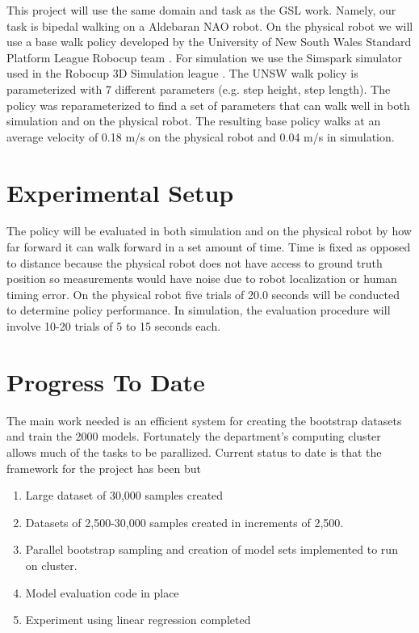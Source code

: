 \documentclass[12 pt,two column]{article}
\begin{document}
This project will use the same domain and task as the GSL work. Namely, our task is bipedal walking on a Aldebaran NAO robot. On the physical robot we will use a base walk policy developed by the University of New South Wales Standard Platform League Robocup team \cite{ashar2014robocup}. For simulation we use the Simspark simulator used in the Robocup 3D Simulation league \cite{simspark}. The UNSW walk policy is parameterized with 7 different parameters (e.g. step height, step length). The policy was reparameterized to find a set of parameters that can walk well in both simulation and on the physical robot. The resulting base policy walks at an average velocity of 0.18 m/s on the physical robot and 0.04 m/s in simulation.

\section{Experimental Setup}

The policy will be evaluated in both simulation and on the physical robot by how far forward it can walk forward in a set amount of time. Time is fixed as opposed to distance because the physical robot does not have access to ground truth position so measurements would have noise due to robot localization or human timing error. On the physical robot five trials of 20.0 seconds will be conducted to determine policy performance. In simulation, the evaluation procedure will involve 10-20 trials of 5 to 15 seconds each. 

\section{Progress To Date}
The main work needed is an efficient system for creating the bootstrap datasets and train the 2000 models. Fortunately the department's computing cluster allows much of the tasks to be parallized. Current status to date is that the framework for the project has been but 

\begin{enumerate}
\item Large dataset of 30,000 samples created
\item Datasets of 2,500-30,000 samples created in increments of 2,500.
\item Parallel bootstrap sampling and creation of model sets implemented to run on cluster.
\item Model evaluation code in place
\item Experiment using linear regression completed
\end{enumerate}
\end{document}
